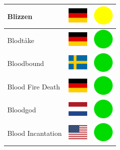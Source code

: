 \documentclass[12pt, a4paper, twoside]{report}
\begin{document}
\begin{center}
\begin{longtable}{|p{5cm}|p{2cm}|p{2cm}|}
			Blizzen & \includegraphics[width=1cm]{4x3/de} & \includegraphics[width=1cm]{likes/m} \\ \hline
			Blodtåke & \includegraphics[width=1cm]{4x3/de} & \includegraphics[width=1cm]{likes/y} \\ \hline
			Bloodbound & \includegraphics[width=1cm]{4x3/se} & \includegraphics[width=1cm]{likes/y} \\ \hline
			Blood Fire Death & \includegraphics[width=1cm]{4x3/de} & \includegraphics[width=1cm]{likes/y} \\ \hline
			Bloodgod & \includegraphics[width=1cm]{4x3/nl} & \includegraphics[width=1cm]{likes/y} \\ \hline
			Blood Incantation & \includegraphics[width=1cm]{4x3/us} & \includegraphics[width=1cm]{likes/y} \\ \hline

\end{longtable}
\end{center}
\end{document}
